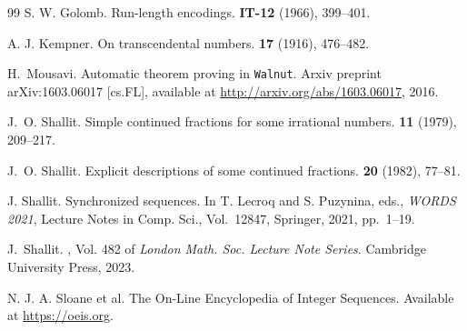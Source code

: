 \documentclass[12pt,reqno]{article}
\begin{document}
\begin{thebibliography}{99}
S. W. Golomb.
\newblock Run-length encodings.
 {\bf IT-12} (1966), 399--401.

A. J. Kempner.
\newblock On transcendental numbers.
 {\bf 17} (1916), 476--482.

H.~Mousavi.
\newblock Automatic theorem proving in {{\tt Walnut}}.
\newblock Arxiv preprint arXiv:1603.06017 [cs.FL], available at
  \url{http://arxiv.org/abs/1603.06017}, 2016.

J.~O. Shallit.
\newblock Simple continued fractions for some irrational numbers.
 {\bf 11} (1979), 209--217.

J.~O. Shallit.
\newblock Explicit descriptions of some continued fractions.
 {\bf 20} (1982), 77--81.

J. Shallit.
\newblock Synchronized sequences.
\newblock In T. Lecroq and S. Puzynina, eds., {\it WORDS 2021},
Lecture Notes in Comp. Sci., Vol.~12847, Springer, 2021, pp.~1--19.

J.~Shallit.
, Vol. 482 of {\em London Math. Soc.
  Lecture Note Series}.
\newblock Cambridge University Press, 2023.

N. J. A. Sloane et al.
\newblock The On-Line Encyclopedia of Integer Sequences.
\newblock Available at \url{https://oeis.org}.


\end{thebibliography}
\end{document}
